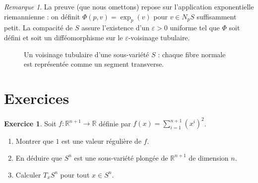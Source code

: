 \documentclass[12pt,a4paper,openany]{book}
\theoremstyle{definition}
\newtheorem{exercice}{Exercice}[chapter]
\theoremstyle{plain}
\theoremstyle{remark}
\newtheorem{remarque}[definition]{Remarque}
\newcommand{\R}{\mathbb{R}}
\begin{document}
\begin{remarque}\label{rem:voisinage-tubulaire-construction}
La preuve (que nous omettons) repose sur l'application exponentielle riemannienne :
on définit $\Phi(p, v) = \exp_p(v)$ pour $v \in N_pS$ suffisamment petit.
La compacité de $S$ assure l'existence d'un $\varepsilon > 0$ uniforme tel que
$\Phi$ soit défini et soit un difféomorphisme sur le $\varepsilon$-voisinage tubulaire.
\end{remarque}

\begin{figure}[ht]
\centering
{}
\caption{Un voisinage tubulaire d'une sous-variété $S$ : chaque fibre
normale est représentée comme un segment transverse.}\label{fig:voisinage-tubulaire}
\end{figure}

\section{Exercices}\label{sec:exo-ch4}

\begin{exercice}\label{exo:sphere-variete}
Soit $f : \R^{n+1} \to \R$ définie par $f(x) = \sum_{i=1}^{n+1} (x^i)^2$.
\begin{enumerate}[label=(\alph*)]
  \item Montrer que $1$ est une valeur régulière de $f$.
  \item En déduire que $S^n$ est une sous-variété plongée de $\R^{n+1}$ de dimension $n$.
  \item Calculer $T_xS^n$ pour tout $x \in S^n$.
\end{enumerate}
\end{exercice}
\end{document}
